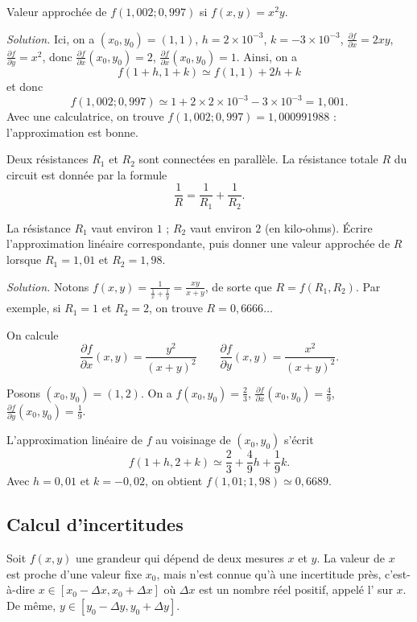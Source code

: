 \documentclass[11pt, class=report,crop=false]{standalone}
\begin{document}
\begin{exemple}
Valeur approchée de $f(1,002 ; 0,997)$ si $f(x,y) = x^2y$.
\bigskip

\emph{Solution.}
Ici, on a $(x_0,y_0) = (1,1)$, $h = 2 \times 10^{-3}$, $k = -3 \times 10^{-3}$,
$\frac{\partial f}{\partial x} = 2xy$, $\frac{\partial f}{\partial y} = x^2$, donc $\frac{\partial f}{\partial x}(x_0,y_0) = 2$, $\frac{\partial f}{\partial x}(x_0,y_0) = 1$. Ainsi, on a
$$f(1+h,1+k) \simeq f(1,1) + 2h + k$$
et donc 
$$f(1,002 ; 0,997) \simeq 1 + 2 \times 2 \times 10^{-3} - 3 \times 10^{-3} = 1,001.$$
Avec une calculatrice, on trouve $f(1,002 ; 0,997) = 1,000991988$ : l'approximation est bonne.
\end{exemple}

\begin{exemple}
Deux résistances $R_1$ et $R_2$ sont connectées en parallèle. La résistance totale $R$ du circuit est donnée par la formule 
$$\frac{1}{R} = \frac{1}{R_1} + \frac{1}{R_2}.$$

La résistance $R_1$ vaut environ $1$ ; $R_2$ vaut environ $2$ (en kilo-ohms).
\'Ecrire l'approximation linéaire correspondante, puis donner une valeur approchée de $R$ lorsque $R_1 = 1,01$ et $R_2 = 1,98$.

\bigskip

\emph{Solution.}
Notons $f(x,y) = \frac{1}{\frac{1}{x} + \frac{1}{y}} = \frac{xy}{x+y}$, de sorte que $R = f(R_1,R_2)$.
Par exemple, si $R_1 = 1$ et $R_2 = 2$, on trouve $R = 0,6666\ldots$


On calcule 
$$\frac{\partial f}{\partial x}(x,y) = \frac{y^2}{(x+y)^2} \qquad
\frac{\partial f}{\partial y}(x,y) = \frac{x^2}{(x+y)^2}.$$

Posons $(x_0,y_0)=(1,2)$. On a $f(x_0,y_0) = \frac 23$,
$\frac{\partial f}{\partial x}(x_0,y_0) = \frac 49$,
$\frac{\partial f}{\partial y}(x_0,y_0) = \frac 19$.

L'approximation linéaire de $f$ au voisinage de $(x_0,y_0)$ s'écrit
$$f(1+h,2+k) \simeq \frac 23 + \frac49 h + \frac19 k.$$
Avec $h = 0,01$ et $k = -0,02$, on obtient
$f(1,01 ; 1,98) \simeq 0,6689$.
\end{exemple}


\subsection{Calcul d'incertitudes}


Soit $f(x,y)$ une grandeur qui dépend de deux mesures $x$ et $y$.
La valeur de $x$ est proche d'une valeur fixe $x_0$, mais n'est connue qu'à une incertitude près, c'est-à-dire $x \in [x_0-\Delta x,x_0 + \Delta x]$ où $\Delta x$ est un nombre réel positif, appelé l' sur $x$.
De même, $y \in [y_0-\Delta y,y_0 + \Delta y]$.
\end{document}
